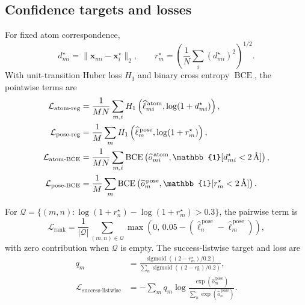 \subsection{Confidence targets and losses}
\label{app:confidence_loss_details}

For fixed atom correspondence,
\begin{equation}
    d_{mi}^{\star}
    =
    \|\mathbf{x}_{mi}-\mathbf{x}^{\star}_i\|_2,
    \qquad
    r_m^{\star}
    =
    \left(
      \frac{1}{N}\sum_i(d_{mi}^{\star})^2
    \right)^{1/2}.
    \label{eq:confidence_targets}
\end{equation}
With unit-transition Huber loss \(H_1\) and binary cross entropy
\(\operatorname{BCE}\), the pointwise terms are
\begin{align}
    \mathcal{L}_{\mathrm{atom\text{-}reg}}
    &=
    \frac{1}{MN}\sum_{m,i}
    H_1\left(
      \widehat{\ell}^{\,\mathrm{atom}}_{mi},
      \log(1+d_{mi}^{\star})
    \right),\\
    \mathcal{L}_{\mathrm{pose\text{-}reg}}
    &=
    \frac{1}{M}\sum_m
    H_1\left(
      \widehat{\ell}^{\,\mathrm{pose}}_m,
      \log(1+r_m^{\star})
    \right),\\
    \mathcal{L}_{\mathrm{atom\text{-}BCE}}
    &=
    \frac{1}{MN}\sum_{m,i}
    \operatorname{BCE}
    \left(
      \widehat{o}^{\,\mathrm{atom}}_{mi},
      \mathbb{1}[d_{mi}^{\star}<2\,\angstrom]
    \right),\\
    \mathcal{L}_{\mathrm{pose\text{-}BCE}}
    &=
    \frac{1}{M}\sum_m
    \operatorname{BCE}
    \left(
      \widehat{o}^{\,\mathrm{pose}}_m,
      \mathbb{1}[r_m^{\star}<2\,\angstrom]
    \right).
    \label{eq:confidence_pointwise_losses}
\end{align}

For
\(\mathcal{Q}=\{(m,n):
\log(1+r_n^{\star})-\log(1+r_m^{\star})>0.3\}\), the pairwise term is
\begin{equation}
    \mathcal{L}_{\mathrm{rank}}
    =
    \frac{1}{|\mathcal{Q}|}
    \sum_{(m,n)\in\mathcal{Q}}
    \max
    \left(
      0,\,
      0.05-
      (\widehat{\ell}^{\,\mathrm{pose}}_n
       -\widehat{\ell}^{\,\mathrm{pose}}_m)
    \right),
    \label{eq:confidence_pairwise}
\end{equation}
with zero contribution when \(\mathcal{Q}\) is empty. The success-listwise
target and loss are
\begin{align}
    q_m
    &=
    \frac{
      \operatorname{sigmoid}
      ((2-r_m^{\star})/0.2)
    }{
      \sum_n
      \operatorname{sigmoid}
      ((2-r_n^{\star})/0.2)
    },\\
    \mathcal{L}_{\mathrm{success\text{-}listwise}}
    &=
    -\sum_m q_m
    \log
    \frac{
      \exp(\widehat{o}^{\,\mathrm{pose}}_m)
    }{
      \sum_n\exp(\widehat{o}^{\,\mathrm{pose}}_n)
    }.
    \label{eq:confidence_listwise}
\end{align}

